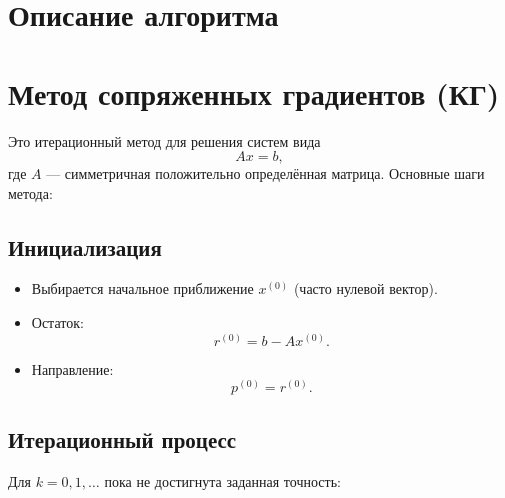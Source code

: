 \documentclass[12pt]{article}
\begin{document}
\section{Описание алгоритма}

\section*{Метод сопряженных градиентов (КГ)}

Это итерационный метод для решения систем вида
\begin{equation}
A x = b,
\end{equation}
где $A$ — симметричная положительно определённая матрица. Основные шаги метода:

\subsection*{Инициализация}
\begin{itemize}
    \item Выбирается начальное приближение $x^{(0)}$ (часто нулевой вектор).
    \item Остаток: 
    \begin{equation}
    r^{(0)} = b - A x^{(0)}.
    \end{equation}
    \item Направление: 
    \begin{equation}
    p^{(0)} = r^{(0)}.
    \end{equation}
\end{itemize}

\subsection*{Итерационный процесс}
Для $k=0,1,\ldots$ пока не достигнута заданная точность:
\end{document}
